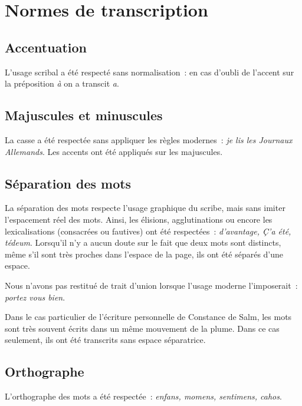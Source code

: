 \documentclass[a4paper,12pt,twoside]{book}
\begin{document}
	\renewcommand{\appendixtocname}{Annexes}
	
	\addappheadtotoc%
	
	\appendixpage %
	\chapter{Normes de transcription}
	
		\section{Accentuation}
			L'usage scribal a été respecté sans normalisation~: en cas d'oubli de l'accent sur la préposition \textit{à} on a transcit \textit{a}.
		
		\section{Majuscules et minuscules}
			La casse a été respectée sans appliquer les règles modernes~: \textit{je lis les Journaux Allemands}. Les accents ont été appliqués sur les majuscules.
		
		\section{Séparation des mots}
			La séparation des mots respecte l'usage graphique du scribe, mais sans imiter l'espacement réel des mots. Ainsi, les élisions, agglutinations ou encore les lexicalisations (consacrées ou fautives) ont été respectées~: \textit{d'avantage, Ç'a été, tédeum}. Lorsqu'il n'y a aucun doute sur le fait que deux mots sont distincts, même s'il sont très proches dans l'espace de la page, ils ont été séparés d'une espace.
		
			Nous n'avons pas restitué de trait d'union lorsque l'usage moderne l'imposerait~: \textit{portez vous bien}.
	
			Dans le cas particulier de l'écriture personnelle de Constance de Salm, les mots sont très souvent écrits dans un même mouvement de la plume. Dans ce cas seulement, ils ont été transcrits sans espace séparatrice.
				
		\section{Orthographe}
			L'orthographe des mots a été respectée~: \textit{enfans, momens, sentimens, cahos}.
			
\end{document}
